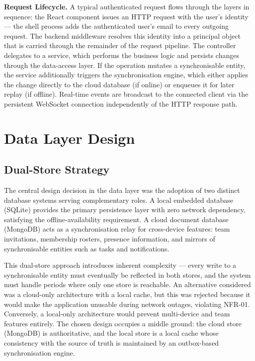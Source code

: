 \textbf{Request Lifecycle.}
A typical authenticated request flows through the layers in sequence: the
React component issues an HTTP request with the user's identity --- the
shell process adds the authenticated user's email to every outgoing request.
The backend middleware resolves this identity into a principal object that is
carried through the remainder of the request pipeline. The controller delegates
to a service, which performs the business logic and persists changes through the
data-access layer. If the operation mutates a synchronisable entity, the service
additionally triggers the synchronisation engine, which either applies the change
directly to the cloud database (if online) or enqueues it for later replay (if
offline). Real-time events are broadcast to the connected client via the
persistent WebSocket connection independently of the HTTP response path.


\section{Data Layer Design}\label{sec:meth_data}

\subsection{Dual-Store Strategy}

The central design decision in the data layer was the adoption of two distinct
database systems serving complementary roles. A local embedded database
(SQLite) provides the primary persistence layer with zero network dependency,
satisfying the offline-availability requirement. A cloud document database
(MongoDB) acts as a synchronisation relay for cross-device features: team
invitations, membership rosters, presence information, and mirrors of
synchronisable entities such as tasks and notifications.

This dual-store approach introduces inherent complexity --- every write to a
synchronisable entity must eventually be reflected in both stores, and the
system must handle periods where only one store is reachable. An alternative
considered was a cloud-only architecture with a local cache, but this was
rejected because it would make the application unusable during network
outages, violating NFR-01. Conversely, a local-only architecture would prevent
multi-device and team features entirely. The chosen design occupies a middle
ground: the cloud store (MongoDB) is authoritative, and the local store is a
local cache whose consistency with the source of truth is maintained by an
outbox-based synchronisation engine.

